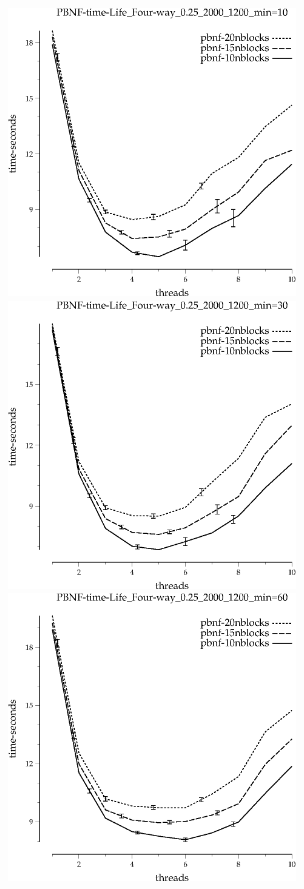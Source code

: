 \documentclass{article}
\begin{document}
\begin{figure}[t]
\begin{center}
\includegraphics[width=3in]{grid_life_four-way_0.25_2000_1200/PBNF-time-Life_Four-way_0.25_2000_1200_min=10.eps}
\includegraphics[width=3in]{grid_life_four-way_0.25_2000_1200/PBNF-time-Life_Four-way_0.25_2000_1200_min=30.eps}
\includegraphics[width=3in]{grid_life_four-way_0.25_2000_1200/PBNF-time-Life_Four-way_0.25_2000_1200_min=60.eps}

\end{center}
\end{figure}
\end{document}
